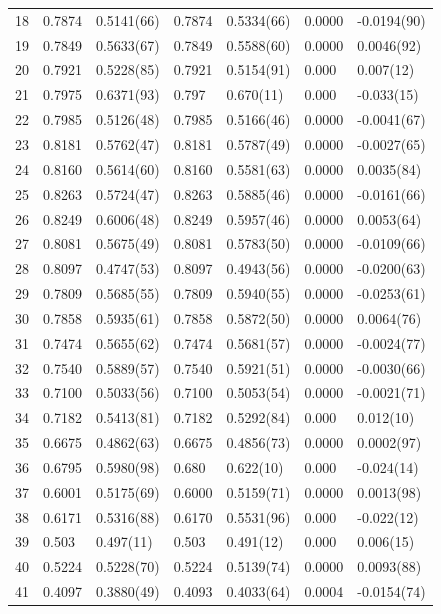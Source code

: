 \documentclass[aps, prc, tightenlines,superscriptaddress, letterpaper, amsmath, amssymb, preprintnumbers, floatfix, longbibliography, nofootinbib]{revtex4-2}
\begin{document}
\begin{table}[!htb]
{\begin{tabularx}{\textwidth}{| c || Y | Y | Y | Y | Y | Y |}
18	&	0.7874	&	0.5141(66)	&	0.7874	&	0.5334(66)	&	0.0000	&	-0.0194(90)	\\
19	&	0.7849	&	0.5633(67)	&	0.7849	&	0.5588(60)	&	0.0000	&	0.0046(92)	\\
20	&	0.7921	&	0.5228(85)	&	0.7921	&	0.5154(91)	&	0.000	&	0.007(12)	\\
21	&	0.7975	&	0.6371(93)	&	0.797	&	0.670(11)	&	0.000	&	-0.033(15)	\\
22	&	0.7985	&	0.5126(48)	&	0.7985	&	0.5166(46)	&	0.0000	&	-0.0041(67)	\\
23	&	0.8181	&	0.5762(47)	&	0.8181	&	0.5787(49)	&	0.0000	&	-0.0027(65)	\\
24	&	0.8160	&	0.5614(60)	&	0.8160	&	0.5581(63)	&	0.0000	&	0.0035(84)	\\
25	&	0.8263	&	0.5724(47)	&	0.8263	&	0.5885(46)	&	0.0000	&	-0.0161(66)	\\
26	&	0.8249	&	0.6006(48)	&	0.8249	&	0.5957(46)	&	0.0000	&	0.0053(64)	\\
27	&	0.8081	&	0.5675(49)	&	0.8081	&	0.5783(50)	&	0.0000	&	-0.0109(66)	\\
28	&	0.8097	&	0.4747(53)	&	0.8097	&	0.4943(56)	&	0.0000	&	-0.0200(63)	\\
29	&	0.7809	&	0.5685(55)	&	0.7809	&	0.5940(55)	&	0.0000	&	-0.0253(61)	\\
30	&	0.7858	&	0.5935(61)	&	0.7858	&	0.5872(50)	&	0.0000	&	0.0064(76)	\\
31	&	0.7474	&	0.5655(62)	&	0.7474	&	0.5681(57)	&	0.0000	&	-0.0024(77)	\\
32	&	0.7540	&	0.5889(57)	&	0.7540	&	0.5921(51)	&	0.0000	&	-0.0030(66)	\\
33	&	0.7100	&	0.5033(56)	&	0.7100	&	0.5053(54)	&	0.0000	&	-0.0021(71)	\\
34	&	0.7182	&	0.5413(81)	&	0.7182	&	0.5292(84)	&	0.000	&	0.012(10)	\\
35	&	0.6675	&	0.4862(63)	&	0.6675	&	0.4856(73)	&	0.0000	&	0.0002(97)	\\
36	&	0.6795	&	0.5980(98)	&	0.680	&	0.622(10)	&	0.000	&	-0.024(14)	\\
37	&	0.6001	&	0.5175(69)	&	0.6000	&	0.5159(71)	&	0.0000	&	0.0013(98)	\\
38	&	0.6171	&	0.5316(88)	&	0.6170	&	0.5531(96)	&	0.000	&	-0.022(12)	\\
39	&	0.503	&	0.497(11)	&	0.503	&	0.491(12)	&	0.000	&	0.006(15)	\\
40	&	0.5224	&	0.5228(70)	&	0.5224	&	0.5139(74)	&	0.0000	&	0.0093(88)	\\
41	&	0.4097	&	0.3880(49)	&	0.4093	&	0.4033(64)	&	0.0004	&	-0.0154(74)	\\

\end{tabularx}}
\end{table}
\end{document}
